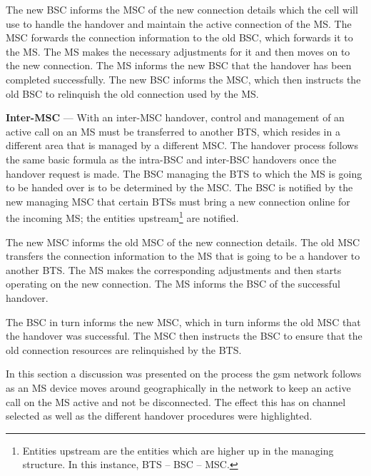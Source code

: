 \begin{description}
The new \gls{BSC} informs the \gls{MSC} of the new connection details which the cell will use to handle the handover and maintain the active connection of the \gls{MS}\@. The \gls{MSC} forwards the connection information to the old \gls{BSC}, which forwards it to the \gls{MS}\@. The \gls{MS} makes the necessary adjustments for it and then moves on to the new connection. The \gls{MS} informs the new \gls{BSC} that the handover has been completed successfully. The new \gls{BSC} informs the \gls{MSC}, which then instructs the old \gls{BSC} to relinquish the old connection used by the \gls{MS}\cite{wirelesstelcoMullet,GSMArchitectureProtocolsServices}.
\item{\textbf{Inter-MSC}} --- With an inter-\gls{MSC} handover, control and management of an active call on an \gls{MS} must be transferred to another \gls{BTS}, which resides in a different area that is managed by a different MSC\@. The handover process follows the same basic formula as the intra-\gls{BSC} and inter-\gls{BSC} handovers once the handover request is made\cite{wirelesstelcoMullet,GSMArchitectureProtocolsServices}.
  The \gls{BSC} managing the \gls{BTS} to which the \gls{MS} is going to be handed over is to be determined by the MSC\@. The \gls{BSC} is notified by the new managing \gls{MSC} that certain \glspl{BTS} must bring a new connection online for the incoming \gls{MS}; the entities upstream\footnote{Entities upstream are the entities which are higher up in the managing structure. In this instance, \gls{BTS} -- \gls{BSC} -- \gls{MSC}\@.} are notified\cite{wirelesstelcoMullet,GSMArchitectureProtocolsServices}.

  The new \gls{MSC} informs the old \gls{MSC} of the new connection details. The old \gls{MSC} transfers the connection information to the \gls{MS} that is going to be a handover to another \gls{BTS}\@. The \gls{MS} makes the corresponding adjustments and then starts operating on the new connection. The \gls{MS} informs the \gls{BSC} of the successful handover\cite{wirelesstelcoMullet,GSMArchitectureProtocolsServices}. 

  The \gls{BSC} in turn informs the new \gls{MSC}, which in turn informs the old \gls{MSC} that the handover was successful. The \gls{MSC} then instructs the \gls{BSC} to ensure that the old connection resources are relinquished by the \gls{BTS}.
\end{description}

In this section a discussion was presented on the process the \gls{gsm} network follows as an \gls{MS} device moves around geographically in the network to keep an active call on the \gls{MS} active and not be disconnected. The effect this has on channel selected as well as the different handover procedures were highlighted. 
